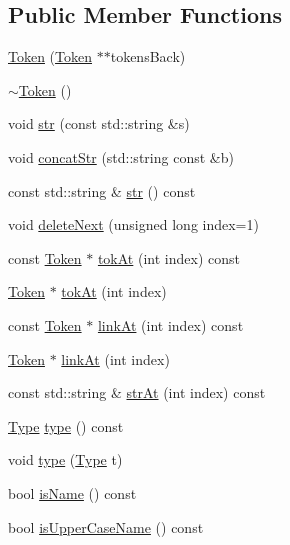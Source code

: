 \subsection*{Public Member Functions}
\begin{DoxyCompactItemize}
\item 
\hyperlink{class_token_a329c533a1d0e5dfb936cd7d953ca3e98}{Token} (\hyperlink{class_token}{Token} $\ast$$\ast$tokens\-Back)
\item 
\hyperlink{class_token_a3d7d59eaac1535df1433357d5d372f84}{$\sim$\-Token} ()
\item 
void \hyperlink{class_token_a25c9fce751f8059dc0e3b82e4e80576d}{str} (const std\-::string \&s)
\item 
void \hyperlink{class_token_a4829bc559541958da62525fd1a461ca7}{concat\-Str} (std\-::string const \&b)
\item 
const std\-::string \& \hyperlink{class_token_aa33330e2daeccaa32f3a413ffe668d46}{str} () const 
\item 
void \hyperlink{class_token_a1ade919f02c006e4bc0ce7f4f0ff1361}{delete\-Next} (unsigned long index=1)
\item 
const \hyperlink{class_token}{Token} $\ast$ \hyperlink{class_token_ac75b6b92772de46c8979ae4dbf5be8c2}{tok\-At} (int index) const 
\item 
\hyperlink{class_token}{Token} $\ast$ \hyperlink{class_token_a5f6ce00265a2e01c9f1fbb8542831918}{tok\-At} (int index)
\item 
const \hyperlink{class_token}{Token} $\ast$ \hyperlink{class_token_ad9138d6509a90f18618c2ace0770f8f0}{link\-At} (int index) const 
\item 
\hyperlink{class_token}{Token} $\ast$ \hyperlink{class_token_abfafe70587786bcd15bb631f8a11069f}{link\-At} (int index)
\item 
const std\-::string \& \hyperlink{class_token_a6e5d5fef298aadf811bd5089de1813c6}{str\-At} (int index) const 
\item 
\hyperlink{class_token_acf70e9411196c602738c3ed2428c7137}{Type} \hyperlink{class_token_aa50a35dc309d8739696d736de59e8746}{type} () const 
\item 
void \hyperlink{class_token_a824d6ce5c5d30073dc619318620c6b3d}{type} (\hyperlink{class_token_acf70e9411196c602738c3ed2428c7137}{Type} t)
\item 
bool \hyperlink{class_token_a5a21d079041cf32cf96fe5d235b8547d}{is\-Name} () const 
\item 
bool \hyperlink{class_token_a36c8c3cd693ca2de2de5a0444ca3f6c7}{is\-Upper\-Case\-Name} () const 
$$
\end{DoxyCompactItemize}
